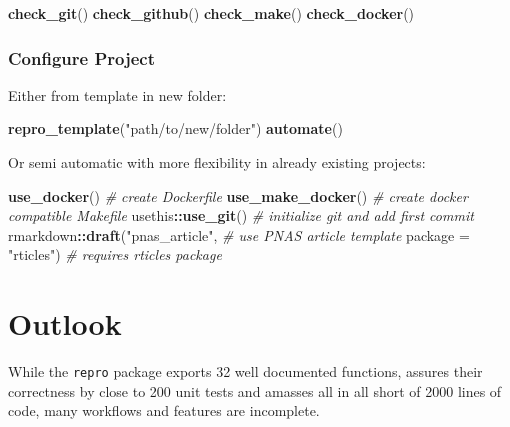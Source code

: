 \documentclass[12pt,a4paper,]{article}
\newenvironment{Shaded}{\begin{snugshade}}{\end{snugshade}}
\newcommand{\CommentTok}[1]{\textcolor[rgb]{0.56,0.35,0.01}{\textit{#1}}}
\newcommand{\DataTypeTok}[1]{\textcolor[rgb]{0.13,0.29,0.53}{#1}}
\newcommand{\KeywordTok}[1]{\textcolor[rgb]{0.13,0.29,0.53}{\textbf{#1}}}
\newcommand{\NormalTok}[1]{#1}
\newcommand{\OperatorTok}[1]{\textcolor[rgb]{0.81,0.36,0.00}{\textbf{#1}}}
\newcommand{\StringTok}[1]{\textcolor[rgb]{0.31,0.60,0.02}{#1}}
\begin{document}
\begin{Shaded}
\begin{Highlighting}[]
\KeywordTok{check_git}\NormalTok{()}
\KeywordTok{check_github}\NormalTok{()}
\KeywordTok{check_make}\NormalTok{()}
\KeywordTok{check_docker}\NormalTok{()}
\end{Highlighting}
\end{Shaded}

\hypertarget{configure-project}{%
\subsubsection{Configure Project}\label{configure-project}}

Either from template in new folder:

\begin{Shaded}
\begin{Highlighting}[]
\KeywordTok{repro_template}\NormalTok{(}\StringTok{"path/to/new/folder"}\NormalTok{)}
\KeywordTok{automate}\NormalTok{()}
\end{Highlighting}
\end{Shaded}

Or semi automatic with more flexibility in already existing projects:

\begin{Shaded}
\begin{Highlighting}[]
\KeywordTok{use_docker}\NormalTok{() }\CommentTok{# create Dockerfile}
\KeywordTok{use_make_docker}\NormalTok{() }\CommentTok{# create docker compatible Makefile}
\NormalTok{usethis}\OperatorTok{::}\KeywordTok{use_git}\NormalTok{() }\CommentTok{# initialize git and add first commit}
\NormalTok{rmarkdown}\OperatorTok{::}\KeywordTok{draft}\NormalTok{(}\StringTok{"pnas_article"}\NormalTok{, }\CommentTok{# use PNAS article template}
                 \DataTypeTok{package =} \StringTok{"rticles"}\NormalTok{) }\CommentTok{# requires rticles package}
\end{Highlighting}
\end{Shaded}

\hypertarget{outlook}{%
\section{Outlook}\label{outlook}}

While the \texttt{repro} package exports 32 well documented functions, assures their correctness by close to 200 unit tests and amasses all in all short of 2000 lines of code, many workflows and features are incomplete.
\end{document}
